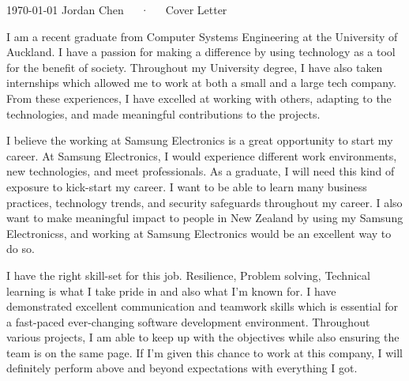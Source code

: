 \documentclass[11pt, a4paper]{awesome-cv}
\begin{document}
\makecvheader[L]

\makecvfooter
  {\today}
  {Jordan Chen~~~·~~~Cover Letter}
  {}

\makelettertitle

\begin{cvletter}

I am a recent graduate from Computer Systems Engineering at the University of Auckland. I have a passion for making a difference by using technology as a tool for the benefit of society. Throughout my University degree, I have also taken internships which allowed me to work at both a small and a large tech company. From these experiences, I have excelled at working with others, adapting to the technologies, and made meaningful contributions to the projects.

I believe the working at Samsung Electronics is a great opportunity to start my career. At Samsung Electronics, I would experience different work environments, new technologies, and meet professionals. As a graduate, I will need this kind of exposure to kick-start my career. I want to be able to learn many business practices, technology trends, and security safeguards throughout my career. I also want to make meaningful impact to people in New Zealand by using my Samsung Electronicss, and working at Samsung Electronics would be an excellent way to do so.

I have the right skill-set for this job. Resilience, Problem solving, Technical learning is what I take pride in and also what I'm known for. I have demonstrated excellent communication and teamwork skills which is essential for a fast-paced ever-changing software development environment. Throughout various projects, I am able to keep up with the objectives while also ensuring the team is on the same page. If I'm given this chance to work at this company, I will definitely perform above and beyond expectations with everything I got.

\end{cvletter}


\makeletterclosing
\end{document}
